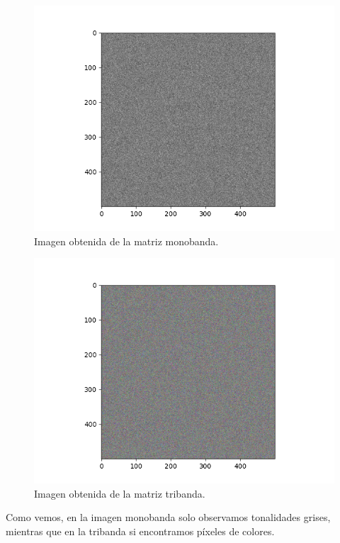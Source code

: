 \documentclass[12pt, spanish]{article}
\begin{document}
\begin{figure}[H]
	\centering
	\includegraphics[scale = 0.70]{monobanda.png}
	\caption{Imagen obtenida de la matriz monobanda.}
	\label{fig:ej2-mono}
	
\end{figure}


\begin{figure}[H]
	\centering
	\includegraphics[scale = 0.70]{tribanda.png}
	\caption{Imagen obtenida de la matriz tribanda.}
	\label{fig:ej2-tri}
	
\end{figure}

Como vemos, en la imagen monobanda solo observamos tonalidades grises, mientras que en la tribanda si encontramos píxeles de colores.
\end{document}

